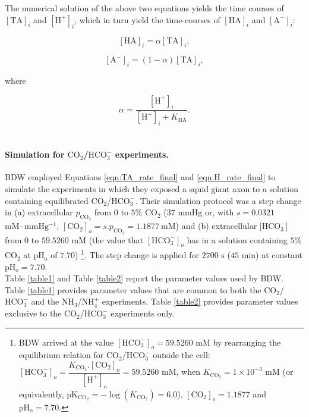\documentclass[fleqn,10pt]{physiome}
\begin{document}
The numerical solution of the above two equations yields the time courses of $[\mathrm{TA}]_i$ and $[\mathrm{H^+}]_i$, which in turn yield the time-courses of $[\mathrm{HA}]_i$ and $[\mathrm{A^-}]_i$:

\begin{equation}
\mathrm{[HA]}_i=\alpha\mathrm{[TA]}_i,
\end{equation}

\begin{equation}
\mathrm{[A^-]}_i=(1-\alpha)\mathrm{[TA]}_i,
\end{equation}

where

\begin{equation}
\alpha=\dfrac{\mathrm{[H^+]}_i}{\mathrm{[H^+]}_i+K_\mathrm{HA}}.
\label{eqn:alpha}
\end{equation}
\\

\paragraph{Simulation for $\mathrm{CO_2}$/$\mathrm{HCO_3^-}$ experiments.}

BDW employed Equations \ref{eqn:TA_rate_final} and \ref{eqn:H_rate_final} to simulate the experiments in which they exposed a squid giant axon to a solution containing equilibrated $\mathrm{CO_2}$/$\mathrm{HCO_3^-}$. Their simulation protocol was a step change in (a) extracellular $p_\mathrm{CO_2}$ from $0$ to $5\%$ $\mathrm{CO_2}$ ($37$ $\mathrm{mmHg}$ or, with $s=0.0321$ $\mathrm{mM\cdot mmHg^{-1}}$, $\mathrm{[CO_2]}_o=s.p_\mathrm{CO_2}=1.1877~\mathrm{mM}$) and (b) extracellular [$\mathrm{HCO_3^-}$] from $0$ to $59.5260$ $\mathrm{mM}$ (the value that $\mathrm{[HCO_3^-]}_o$ has in a solution containing $5\%$ $\mathrm{CO_2}$ at $\mathrm{pH_o}$ of $7.70$) \footnote{BDW arrived at the value $\mathrm{[HCO_3^-]}_o= 59.5260$ mM by rearranging the equilibrium relation for $\mathrm{CO_2}$/$\mathrm{HCO_3^-}$ outside the cell: $\mathrm{[HCO_3^-]}_o=\dfrac{K_\mathrm{CO_2}.\mathrm{[CO_2]}_o}{\mathrm{[H^+]}_o}= 59.5260$ mM, when $K_\mathrm{CO_2}= 1\times 10^{-3}$ mM (or equivalently, $\mathrm{pK_{CO_2}}=-\log(K_\mathrm{CO_2})=6.0$), $\mathrm{[CO_2]}_o= 1.1877$ and $\mathrm{pH_o}= 7.70$.}. The step change is applied for $2700$ $\mathrm{s}$ ($45$ $\mathrm{min}$) at constant $\mathrm{pH_o}=7.70$.\\

Table \ref{table1} and Table \ref{table2} report the parameter values used by BDW. Table \ref{table1} provides parameter values that are common to both the $\mathrm{CO_2}$/$\mathrm{HCO_3^-}$ and the $\mathrm{NH_3}$/$\mathrm{NH_4^+}$ experiments. Table \ref{table2} provides parameter values exclusive to the $\mathrm{CO_2}$/$\mathrm{HCO_3^-}$ experiments only.\\ 
\end{document}
